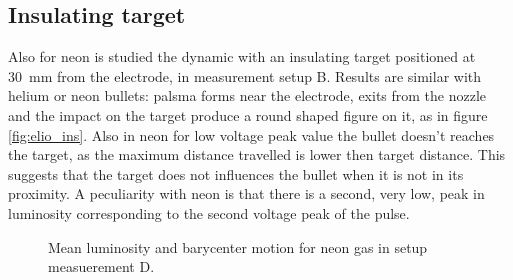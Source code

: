 \subsection{Insulating target}
Also for neon is studied the dynamic with an insulating target positioned at \SI{30}{\milli\meter} from the electrode, in measurement setup B.
Results are similar with helium or neon bullets: palsma forms near the electrode, exits from the nozzle and the impact on the target produce a round shaped figure on it, as in figure \ref{fig:elio_ins}. Also in neon for low voltage peak value the bullet doesn't reaches the target, as the maximum distance travelled is lower then target distance. This suggests that the target does not influences the bullet when it is not in its proximity.
A peculiarity with neon is that there is a second, very low, peak in luminosity corresponding to the second voltage peak of the pulse.
\begin{figure}
 \centering
 \hfill
 \caption{Mean luminosity and barycenter motion for neon gas in setup measuerement D.}
 \label{fig:neon_c_xb}
\end{figure}


